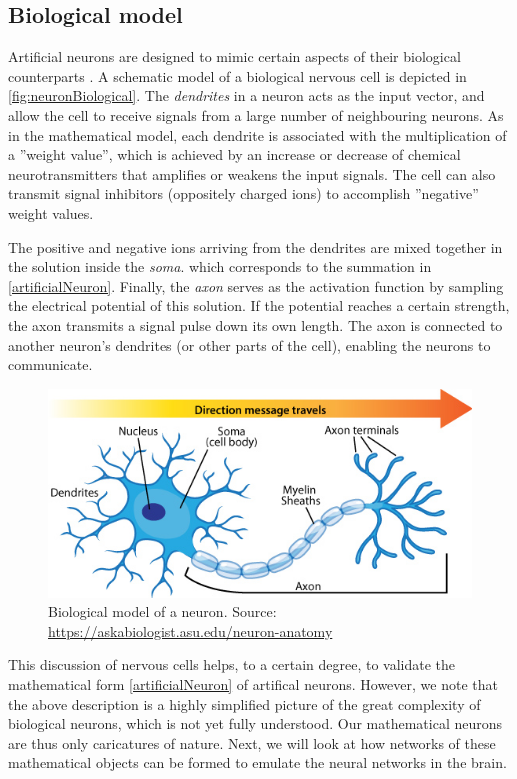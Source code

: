 \documentclass[twoside,english]{uiofysmaster}
\begin{document}
\subsection*{Biological model}
Artificial neurons are designed to mimic certain aspects of their biological counterparts \cite{Kriesel07}. 
A schematic model of a biological nervous cell is depicted in \autoref{fig:neuronBiological}.
The \textit{dendrites} in a neuron acts as the input vector, and allow the cell to receive signals from a large number
of neighbouring neurons. As in the mathematical model, each dendrite is associated with the multiplication of a
''weight value'', which is achieved by an increase or decrease of chemical neurotransmitters that amplifies or
weakens the input signals. The cell can also transmit signal inhibitors (oppositely charged ions) to 
accomplish ''negative'' weight values. 

The positive and negative ions arriving from the dendrites are mixed together in the solution inside the \textit{soma}. 
which corresponds to the summation in \eqref{artificialNeuron}. Finally, the \textit{axon} serves
as the activation function by sampling the electrical potential of this solution. If the potential 
reaches a certain strength, the axon transmits a signal pulse down its own length. The axon is connected 
to another neuron's dendrites (or other parts of the cell), enabling the neurons to communicate. 
\begin{figure}
 \begin{center}
  \includegraphics[width=\linewidth]{Figures/Theory/neuron_anatomy.jpg}
  \caption{Biological model of a neuron. 
	   Source: \href{https://askabiologist.asu.edu/neuron-anatomy}{https://askabiologist.asu.edu/neuron-anatomy}}
  \label{fig:neuronBiological}
 \end{center}
\end{figure}

This discussion of nervous cells helps, to a certain degree, to validate the mathematical form \eqref{artificialNeuron}
of artifical neurons. However, we note that the above description is a highly simplified picture of the great complexity
of biological neurons, which is not yet fully understood. Our mathematical neurons are thus only caricatures of nature. 
Next, we will look at how networks of these mathematical objects can be formed to emulate the neural networks
in the brain.
\end{document}
